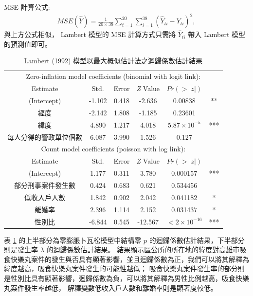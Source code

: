 \documentclass[12pt,a4paper]{article}
\begin{document}
\begin{CJK}{UTF8}{bkai}
 \setlength\abovedisplayskip{25pt}
 \setlength\belowdisplayskip{25pt}
\noindent
MSE 計算公式:
\begin{gather*}
 MSE(\hat{Y})=\frac{1}{20\times 38}\sum_{t=1}^{20}\sum_{i=1}^{38}\left(\hat{Y}_{ti}-Y_{ti}\right)^2,
\end{gather*}
與上方公式相似， Lambert 模型的 MSE 計算方式只需將 $\hat{Y}_{ti}$ 帶入 Lambert 模型的預測值即可。
\begin{table}[H]
\centering
\setlength{\belowcaptionskip}{0.5cm}
\caption{Lambert (1992) 模型以最大概似估計法之迴歸係數估計結果}
\begin{tabular}{cccccc}
\hline
\multicolumn{6}{c}{Zero-inflation model coefficients (binomial with logit link):}\\
Estimate & Std.& Error & \emph{Z} Value & $Pr(>|z|)$\\
\hline
(Intercept) &-1.102 & 0.418 & -2.636 & 0.00838 & ** \\
經度 & -2.142 & 1.808 & -1.185 & 0.23601 &  \\
緯度 & 4.890 & 1.217 & 4.018 & $5.87\times10^{-5}$ & ***\\
每人分得的警政單位個數 & 6.087 & 3.990 & 1.526 & 0.127 &  \\
\hline
\hline
\multicolumn{6}{c}{Count model coefficients (poisson with log link):}\\
Estimate & Std.& Error & \emph{Z} Value & $Pr(>|z|)$\\
\hline
(Intercept) & 1.177 & 0.311 & 3.780 & 0.000157 & ***\\
部分刑事案件發生數 & 0.424 & 0.683 & 0.621 & 0.534456 & \\
低收入戶人數 & 1.842 & 0.902 & 2.042 & 0.041182 & *\\
離婚率 & 2.396 & 1.114 & 2.152 & 0.031437 & *\\
性別比 & -6.844 & 0.545 & -12.567 & $< 2\times10^{-16}$ & ***\\
\hline
\end{tabular}
\label{tab:3}
\end{table}
\noindent

表  \ref{tab:3} 的上半部分為零膨脹卜瓦松模型中結構零 $p$ 的迴歸係數估計結果，下半部分則是發生率 $\lambda$ 的迴歸係數估計結果。
結果顯示區公所的所在地的緯度對高雄市吸食快樂丸案件的發生與否具有顯著影響，並且迴歸係數為正，我們可以將其解釋為緯度越高，吸食快樂丸案件發生的可能性越低；
吸食快樂丸案件發生率的部分則是性別比具有顯著影響，迴歸係數為負，可以將其解釋為男性比例越高，吸食快樂丸案件發生率越低，
解釋變數低收入戶人數和離婚率則是顯著度較低。


\end{CJK}
\end{document}
